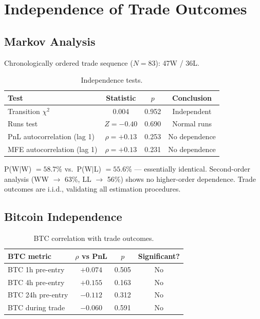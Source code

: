 \documentclass[11pt,a4paper]{article}
\begin{document}
\section{Independence of Trade Outcomes}
\label{sec:independence}

\subsection{Markov Analysis}

Chronologically ordered trade sequence ($N=83$): 47W / 36L.

\begin{table}[H]
\centering
\caption{Independence tests.}
\begin{tabular}{lccc}
\toprule
\textbf{Test} & \textbf{Statistic} & $p$ & \textbf{Conclusion} \\
\midrule
Transition $\chi^2$ & 0.004 & 0.952 & Independent \\
Runs test & $Z = -0.40$ & 0.690 & Normal runs \\
PnL autocorrelation (lag 1) & $\rho = +0.13$ & 0.253 & No dependence \\
MFE autocorrelation (lag 1) & $\rho = +0.13$ & 0.231 & No dependence \\
\bottomrule
\end{tabular}
\end{table}

P(W$|$W) $= 58.7\%$ vs.\ P(W$|$L) $= 55.6\%$ --- essentially identical. Second-order analysis (WW $\to$ 63\%, LL $\to$ 56\%) shows no higher-order dependence. Trade outcomes are i.i.d., validating all estimation procedures.

\subsection{Bitcoin Independence}

\begin{table}[H]
\centering
\caption{BTC correlation with trade outcomes.}
\begin{tabular}{lccc}
\toprule
\textbf{BTC metric} & $\rho$ vs PnL & $p$ & \textbf{Significant?} \\
\midrule
BTC 1h pre-entry & $+0.074$ & 0.505 & No \\
BTC 4h pre-entry & $+0.155$ & 0.163 & No \\
BTC 24h pre-entry & $-0.112$ & 0.312 & No \\
BTC during trade & $-0.060$ & 0.591 & No \\
\bottomrule
\end{tabular}
\end{table}
\end{document}
